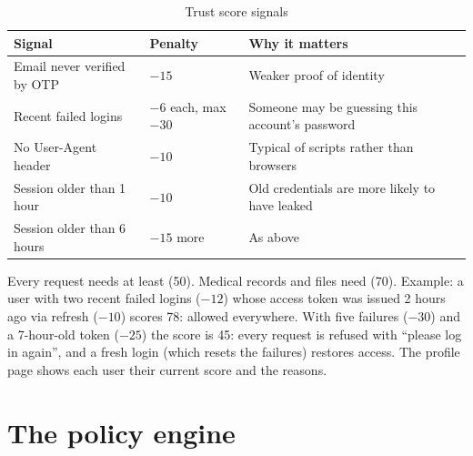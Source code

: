 \begin{table}[H]
\centering\small
\caption{Trust score signals}\label{tab:trust}
\begin{tabularx}{\textwidth}{@{}P{4.2cm}P{1.6cm}Y@{}}
\toprule
\textbf{Signal} & \textbf{Penalty} & \textbf{Why it matters} \\
\midrule
Email never verified by OTP & $-15$ & Weaker proof of identity \\
Recent failed logins & $-6$ each, max $-30$ & Someone may be guessing this account's password \\
No User-Agent header & $-10$ & Typical of scripts rather than browsers \\
Session older than 1 hour & $-10$ & Old credentials are more likely to have leaked \\
Session older than 6 hours & $-15$ more & As above \\
\bottomrule
\end{tabularx}
\end{table}

Every request needs at least  (50). Medical records and
files need  (70). Example: a user with two
recent failed logins ($-12$) whose access token was issued 2 hours ago via
refresh ($-10$) scores 78: allowed everywhere. With five failures ($-30$) and a
7-hour-old token ($-25$) the score is 45: every request is refused with
``please log in again'', and a fresh login (which resets the failures) restores
access. The profile page shows each user their current score and the reasons.

\section{The policy engine}\label{sec:policy}

